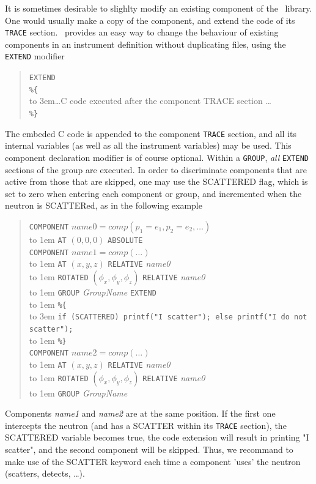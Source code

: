 It is sometimes desirable to slighlty modify an existing component of the \MCS\ library. One would usually make a copy of the component, and extend the code of its \texttt{TRACE} section. \MCS\ provides an easy way to change the behaviour of existing components in an instrument definition without duplicating files, using the \texttt{EXTEND} modifier 
\begin{quote}
  \texttt{EXTEND} \\
  \verb|%{| \\
  \hbox to 3em{}\ldots C code executed after the component TRACE section \ldots \\
  \verb|%}|
\end{quote} 
The embeded C code is appended to the component \texttt{TRACE} section, and all its internal variables (as well as all the instrument variables) may be used.
This component declaration modifier is of course optional. Within a \texttt{GROUP}, \emph{all} \texttt{EXTEND} sections of the group are executed. In order to discriminate components that are active from those that are skipped, one may use the SCATTERED flag, which is set to zero when entering each component or group, and incremented when the neutron is SCATTERed, as in the following example  
\begin{quote}
  \texttt{COMPONENT} $\textit{name0} =
    \textit{comp}(p_1 = e_1, p_2 = e_2, \ldots)$ \\
  \hbox to 1em{} \texttt{AT} $(0,0,0)$ \texttt{ABSOLUTE} \\
  \texttt{COMPONENT} $\textit{name1} =
    \textit{comp}(\ldots)$ \\
  \hbox to 1em{} \texttt{AT} $(x,y,z)$ \texttt{RELATIVE} \textit{name0} \\
  \hbox to 1em{} \texttt{ROTATED} $(\phi_x,\phi_y,\phi_z)$ \texttt{RELATIVE} \textit{name0} \\
  \hbox to 1em{} \texttt{GROUP} \textit{GroupName} \texttt{EXTEND} \\
  \hbox to 1em{} \verb|%{| \\
  \hbox to 3em{} \verb+if (SCATTERED) printf("I scatter"); else printf("I do not scatter");+\\
  \hbox to 1em{} \verb|%}| \\
  \texttt{COMPONENT} $\textit{name2} =
    \textit{comp}(\ldots)$ \\
  \hbox to 1em{} \texttt{AT} $(x,y,z)$ \texttt{RELATIVE} \textit{name0} \\
  \hbox to 1em{} \texttt{ROTATED} $(\phi_x,\phi_y,\phi_z)$ \texttt{RELATIVE} \textit{name0} \\
  \hbox to 1em{} \texttt{GROUP} \textit{GroupName}
\end{quote}
Components \emph{name1} and \emph{name2} are at the same position. If the first one intercepts the neutron (and has a SCATTER within its \texttt{TRACE} section), the SCATTERED variable becomes true, the code extension will result in printing "I scatter", and the second component will be skipped.
Thus, we recommand to make use of the SCATTER keyword each time a component 'uses' the neutron (scatters, detects, \ldots).

